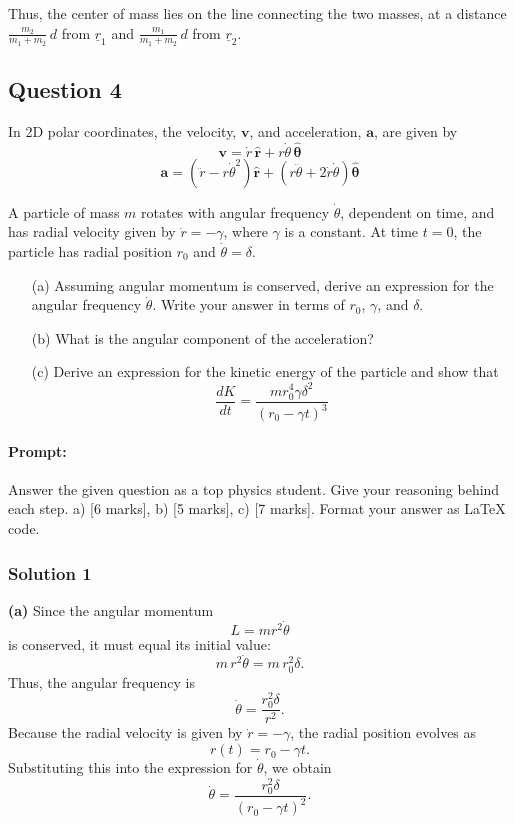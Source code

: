 \documentclass{article}
\begin{document}
Thus, the center of mass lies on the line connecting the two masses, at a distance \(\frac{m_2}{m_1+m_2}\,d\) from \(\underline{r}_1\) and \(\frac{m_1}{m_1+m_2}\,d\) from \(\underline{r}_2\).


\subsection{Question 4}

In 2D polar coordinates, the velocity, \( \mathbf{v} \), and acceleration, \( \mathbf{a} \), are given by
\[
\mathbf{v} = \dot{r} \, \hat{\mathbf{r}} + r \dot{\theta} \, \hat{\boldsymbol{\theta}}
\]
\[
\mathbf{a} = \left( \ddot{r} - r \dot{\theta}^2 \right) \hat{\mathbf{r}} + \left( r \ddot{\theta} + 2 \dot{r} \dot{\theta} \right) \hat{\boldsymbol{\theta}}
\]

A particle of mass \( m \) rotates with angular frequency \( \dot{\theta} \), dependent on time, and has radial velocity given by \( \dot{r} = -\gamma \), where \( \gamma \) is a constant. At time \( t = 0 \), the particle has radial position \( r_0 \) and \( \dot{\theta} = \delta \).

\begin{itemize}
    \item[(a)] Assuming angular momentum is conserved, derive an expression for the angular frequency \( \dot{\theta} \). Write your answer in terms of \( r_0 \), \( \gamma \), and \( \delta \).
    \item[(b)] What is the angular component of the acceleration?
    \item[(c)] Derive an expression for the kinetic energy of the particle and show that
    \[
    \frac{dK}{dt} = \frac{m r_0^4 \gamma \delta^2}{(r_0 - \gamma t)^3}
    \]
\end{itemize}

\paragraph{Prompt: \\} 
Answer the given question as a top physics student. Give your reasoning behind each step. a) [6 marks], b) [5 marks], c) [7 marks].
Format your answer as LaTeX code.

\subsubsection{Solution 1}
\textbf{(a)} Since the angular momentum 
\[
L = m r^2 \dot{\theta}
\]
is conserved, it must equal its initial value:
\[
m\, r^2 \dot{\theta} = m\, r_0^2 \delta.
\]
Thus, the angular frequency is
\[
\dot{\theta} = \frac{r_0^2 \delta}{r^2}.
\]
Because the radial velocity is given by \(\dot{r}=-\gamma\), the radial position evolves as
\[
r(t) = r_0 - \gamma t.
\]
Substituting this into the expression for \(\dot{\theta}\), we obtain
\[
\boxed{\dot{\theta} = \frac{r_0^2 \delta}{\left(r_0 - \gamma t\right)^2}}.
\]
\end{document}
